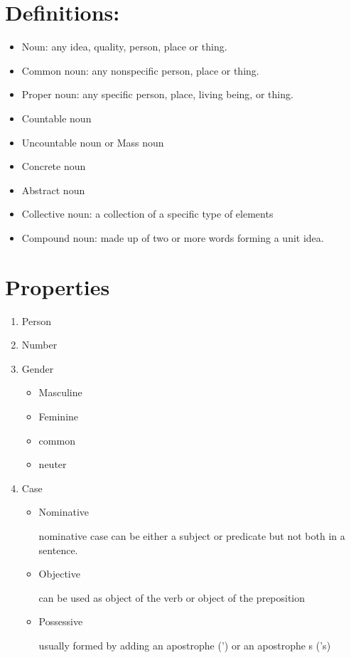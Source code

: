 \documentclass{book}
\begin{document}
\section{Definitions:}
\begin{itemize}
	\item Noun: any idea, quality, person, place or thing.
	\item Common noun: any nonspecific person, place or thing.
	\item Proper noun: any specific person, place, living being, or thing.
	\item Countable noun
	\item Uncountable noun or Mass noun
	\item Concrete noun
	\item Abstract noun
	\item Collective noun: a collection of a specific type of elements
	\item Compound noun: made up of two or more words forming a unit idea.
\end{itemize}

\section{Properties}

\begin{enumerate}
	\item Person
	\item Number
	\item Gender
	      \begin{itemize}
		      \item Masculine
		      \item Feminine
		      \item common
		      \item neuter
	      \end{itemize}
	\item Case
	      \begin{itemize}
		      \item Nominative
		            
		            nominative case can be either a subject or predicate but not both in a sentence.
		      \item Objective
		            
		            can be used as object of the verb or object of the preposition
		      \item Possessive
		            
		            usually formed by adding an apostrophe (') or an apostrophe s ('s)
	      \end{itemize}
\end{enumerate}
\end{document}
